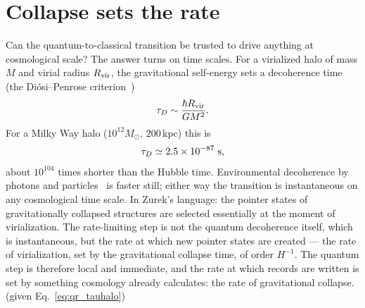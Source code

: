 \section{Collapse sets the rate}\label{sec:qr_rate}
Can the quantum-to-classical transition be trusted to drive anything at cosmological scale? The answer turns on time scales. For a virialized halo of
mass $M$ and virial radius $R_{\rm vir}$, the gravitational self-energy sets a decoherence time (the Di\'osi--Penrose criterion~\cite{Diosi1989,Penrose1996})
\begin{equation}
\tau_D\sim\frac{\hbar R_{\rm vir}}{GM^2}.\label{eq:qr_tauhalo}
\end{equation}
For a Milky Way halo ($10^{12}M_\odot$, $200$\,kpc) this is
\begin{equation}
\tau_D\simeq2.5\times10^{-87}\ {\rm s},\label{eq:qr_tauMW}
\end{equation}
about $10^{104}$ times shorter than the Hubble time. \calc{} Environmental decoherence by photons and particles~\cite{JoosZeh1985} is faster still;
either way the transition is instantaneous on any cosmological time scale. In Zurek's language: the pointer states of gravitationally collapsed
structures are selected essentially at the moment of virialization. The rate-limiting step is not the quantum decoherence itself, which is
instantaneous, but the rate at which new pointer states are created --- the rate of virialization, set by the gravitational collapse time, of order
$H^{-1}$. The quantum step is therefore local and immediate, and the rate at which records are written is set by something cosmology already calculates:
the rate of gravitational collapse. \derived{} (given Eq.~\ref{eq:qr_tauhalo})

